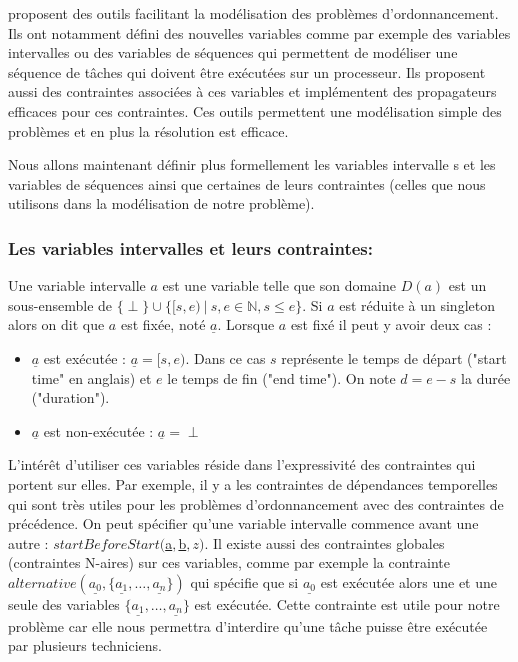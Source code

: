 \cite{Laborie2008,Laborie2009} proposent des outils facilitant la modélisation des problèmes d'ordonnancement.
Ils ont notamment défini des nouvelles variables comme par exemple des variables intervalles ou des variables de séquences qui permettent de modéliser une séquence de tâches qui doivent être exécutées sur un processeur.
Ils proposent aussi des contraintes associées à ces variables et implémentent des propagateurs efficaces pour ces contraintes. 
Ces outils permettent une modélisation simple des problèmes et en plus la résolution est efficace.


Nous allons maintenant définir plus formellement les variables intervalle s et les variables de séquences ainsi que certaines de leurs contraintes (celles que nous utilisons dans la modélisation de notre problème).

\subsubsection{Les variables intervalles et leurs contraintes:}
\begin{mydef}
Une variable intervalle $a$ est une variable telle que son domaine $D(a)$ est un sous-ensemble de $\{\perp\}\cup\{[s,e)~|~s,e \in \mathbb{N}, s\leq e\}$.
Si $a$ est réduite à un singleton alors on dit que $a$ est fixée, noté $\underline{a}$. Lorsque $a$ est fixé il peut y avoir deux cas :
\begin{itemize}
\item $\underline{a}$ est exécutée : $\underline{a} = [s,e)$. Dans ce cas $s$ représente le temps de départ ("start time" en anglais) et $e$ le temps de fin ("end time"). On note $d=e-s$ la durée ("duration").
\item $\underline{a}$ est non-exécutée : $\underline{a} = \perp$
\end{itemize}
\label{def:interval}
\end{mydef}

L'intérêt d'utiliser ces variables réside dans l'expressivité des contraintes qui portent sur elles.
Par exemple, il y a les contraintes de dépendances temporelles qui sont très utiles pour les problèmes d'ordonnancement avec des contraintes de précédence.
On peut spécifier qu'une variable intervalle commence avant une autre : $startBeforeStart($\underline{a}$,$\underline{b}$,z)$.
Il existe aussi des contraintes globales (contraintes N-aires) sur ces variables, comme par exemple la contrainte $alternative(\underline{a_0},\{\underline{a_1},\ldots,\underline{a_n}\})$ qui spécifie que si $\underline{a_0}$ est exécutée alors une et une seule des variables $\{\underline{a_1},\ldots,\underline{a_n}\}$ est exécutée.
Cette contrainte est utile pour notre problème car elle nous permettra d'interdire qu'une tâche puisse être exécutée par plusieurs techniciens.

